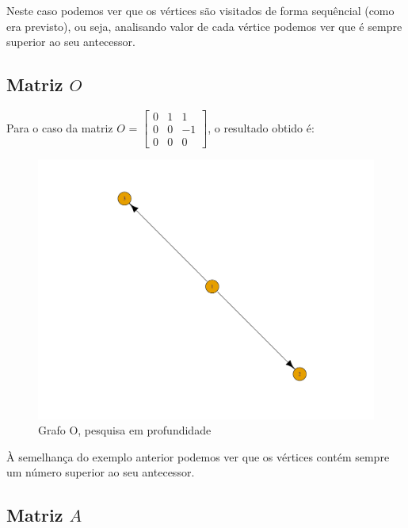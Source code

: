 \documentclass[a4paper,12pt]{report}
\begin{document}
Neste caso podemos ver que os vértices são visitados de forma sequêncial (como era previsto), ou seja, analisando valor de cada vértice podemos ver que é sempre superior ao seu antecessor.

\subsection*{Matriz $O$}

Para o caso da matriz $O$ = $\begin{bmatrix}
    0&1&1\\
    0&0&-1\\
    0&0&0
\end{bmatrix}$, o resultado obtido é:
\begin{figure}[H]
    \centering
        \includegraphics[scale=0.22]{img/dfsO.pdf}
    \caption{Grafo O, pesquisa em profundidade}
    \label{fig:dfsP}
\end{figure}

À semelhança do exemplo anterior podemos ver que os vértices contém sempre um número superior ao seu antecessor.

\subsection*{Matriz $A$}
\end{document}
